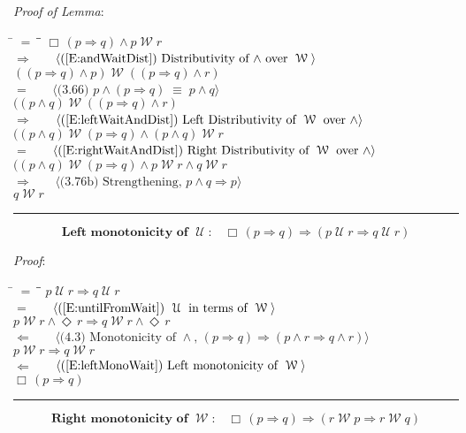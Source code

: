 \documentclass[12pt, fleqn, leqno]{article}
\newcommand{\lgap}{2pt}                             %
\newcommand{\mymathindent}{24pt}                    %
\newcommand{\equivs}{\ensuremath{\;\equiv\;}}       %
\newcommand{\impl}{\ensuremath{\Rightarrow}}        %
\newcommand{\foll}{\ensuremath{\Leftarrow}}         %
\newcommand{\Until}{\;\mathcal{U}\;}
\newcommand{\Wait}{\;\mathcal{W}\;}
\newcommand{\Event}{\Diamond\,}
\newcommand{\Always}{\Box\,}
\newcommand{\myqed}{\rule[-.23ex]{1.2ex}{2.0ex}}
\newcommand{\myqedtab}{\hspace{384pt}}              %
\newcommand{\Gll} {\langle}                         %
\newcommand{\Ggg} {\rangle}                         %
\newcommand{\Hint}[1]     {\ \ \ $\Gll              \mbox{#1} \Ggg$ }   %
\begin{document}
\emph{Proof of Lemma}:
\begin{tabbing}
\hspace{\mymathindent} \= $= \;$ \= \myqedtab \= \kill
  \> \>   $\Always (p \impl q) \land p \Wait r$\\[\lgap]
  \> $\impl$  \>  \Hint{(\ref{E:andWaitDist}) Distributivity of $\land$ over $\Wait$}\\[\lgap]
  \> \>   $((p \impl q) \land p) \Wait ((p \impl q) \land r)$\\[\lgap]
  \> $=$  \>  \Hint{(3.66) $p\land (p \impl q) \equivs  p \land q$}\\[\lgap]
  \> \>   $((p \land q) \Wait ((p \impl q) \land r)$\\[\lgap]
  \> $\impl$  \>  \Hint{(\ref{E:leftWaitAndDist}) Left Distributivity of $\Wait$ over $\land$}\\[\lgap]
  \> \>   $((p \land q) \Wait (p \impl q) \land (p \land q) \Wait r$\\[\lgap]
  \> $=$  \>  \Hint{(\ref{E:rightWaitAndDist}) Right Distributivity of $\Wait$ over $\land$}\\[\lgap]
  \> \>   $((p \land q) \Wait (p \impl q) \land p \Wait r \land q \Wait r$\\[\lgap]
  \> $\impl$ \> \Hint{(3.76b) Strengthening, $p\land q \impl p$} \\[\lgap]
  \> \>   $q \Wait r$ \quad \myqed
\end{tabbing}
\begin{equation}\label{E:leftMonoUntil}
\textbf{Left monotonicity of $\Until$:}\quad \Always (p \impl q) \impl (p \Until r \impl q \Until r)
\end{equation}

\emph{Proof}:
\begin{tabbing}
\hspace{\mymathindent} \= $= \;$ \= \myqedtab \= \kill
  \> \>   $p \Until r \impl q \Until r$\\[\lgap]
  \> $=$ \> \Hint{(\ref{E:untilFromWait}) $\Until$ in terms of $\Wait$} \\[\lgap]
  \> \>   $p \Wait r \land \Event r\impl q \Wait r \land \Event r$\\[\lgap]
  \> $\foll$  \>  \Hint{(4.3) Monotonicity of $\land$, $(p\impl q)\impl (p\land r \impl q\land r)$}\\[\lgap]
  \> \>   $p \Wait r \impl q \Wait r$\\[\lgap]
  \> $\foll$  \>  \Hint{(\ref{E:leftMonoWait}) Left monotonicity of $\Wait$}\\[\lgap]
  \> \>   $\Always (p \impl q)$ \quad \myqed
\end{tabbing}
\begin{equation}\label{E:rightMonoWait}
\textbf{Right monotonicity of $\Wait$:}\quad \Always (p \impl q) \impl (r \Wait p \impl r \Wait q)
\end{equation}
\end{document}
